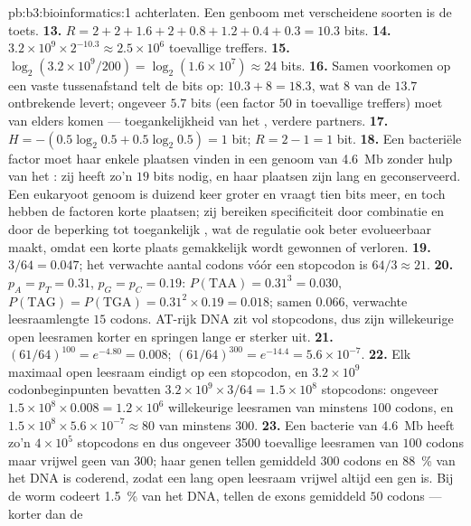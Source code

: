 \begin{solution}{pb:b3:bioinformatics:1}
achterlaten. Een genboom met verscheidene soorten is de toets.
\textbf{13.} $R = 2 + 2 + 1.6 + 2 + 0.8 + 1.2 + 0.4 + 0.3 = 10.3$ bits.
\textbf{14.} $3.2\times 10^{9}\times 2^{-10.3} \approx 2.5\times 10^{6}$
toevallige treffers.
\textbf{15.} $\log_{2}(3.2\times 10^{9}/200) = \log_{2}(1.6\times 10^{7})
\approx 24$ bits.
\textbf{16.} Samen voorkomen op een vaste tussenafstand telt de bits op:
$10.3 + 8 =
18.3$, wat $8$ van de $13.7$ ontbrekende levert; ongeveer $5.7$ bits
(een factor $50$ in toevallige treffers) moet van elders komen ---
toegankelijkheid van het , verdere partners.
\textbf{17.} $H = -(0.5\log_{2}0.5 + 0.5\log_{2}0.5) = 1$ bit; $R = 2 -
1 = 1$ bit.
\textbf{18.} Een bacteriële factor moet haar enkele plaatsen vinden in
een genoom van \qty{4.6}{Mb} zonder hulp van het : zij heeft
zo'n $19$ bits nodig, en haar plaatsen zijn lang en geconserveerd. Een
eukaryoot genoom is duizend keer groter en vraagt tien bits meer, en
toch hebben de factoren korte plaatsen; zij bereiken specificiteit door
combinatie en door de beperking tot toegankelijk , wat de
regulatie ook beter evolueerbaar maakt, omdat een korte plaats
gemakkelijk wordt gewonnen of verloren.
\textbf{19.} $3/64 = 0.047$; het verwachte aantal codons vóór een
stopcodon is $64/3 \approx 21$.
\textbf{20.} $p_{A} = p_{T} = 0.31$, $p_{G} = p_{C} = 0.19$: $P(\text{TAA})
= 0.31^{3} = 0.030$, $P(\text{TAG}) = P(\text{TGA}) = 0.31^{2}\times 0.19
= 0.018$; samen $0.066$, verwachte leesraamlengte $15$ codons. AT-rijk
DNA zit vol stopcodons, dus zijn willekeurige open leesramen korter en
springen lange er sterker uit.
\textbf{21.} $(61/64)^{100} = e^{-4.80} = 0.008$; $(61/64)^{300} =
e^{-14.4} = 5.6\times 10^{-7}$.
\textbf{22.} Elk maximaal open leesraam eindigt op een stopcodon, en
$3.2\times
10^{9}$ codonbeginpunten bevatten $3.2\times 10^{9}\times 3/64 = 1.5\times
10^{8}$ stopcodons: ongeveer $1.5\times 10^{8}\times 0.008 = 1.2\times 10^{6}$
willekeurige leesramen van minstens $100$ codons, en $1.5\times 10^{8}\times
5.6\times 10^{-7} \approx 80$ van minstens $300$.
\textbf{23.} Een bacterie van \qty{4.6}{Mb} heeft zo'n $4\times 10^{5}$
stopcodons en dus ongeveer \num{3500} toevallige leesramen van $100$
codons maar vrijwel geen van $300$; haar genen tellen gemiddeld $300$
codons en \qty{88}{\%} van het DNA is coderend, zodat een lang open
leesraam vrijwel altijd een gen is. Bij de worm codeert \qty{1.5}{\%}
van het DNA, tellen de exons gemiddeld $50$ codons --- korter dan de

\end{solution}

